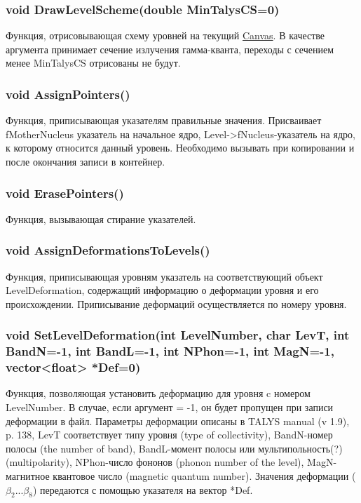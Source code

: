 \documentclass[a4paper,12pt]{extarticle}
\begin{document}
\subsubsection{void DrawLevelScheme(double MinTalysCS=0)}
Функция, отрисовывающая схему уровней на текущий \href{https://root.cern.ch/doc/master/classTCanvas.html}{Canvas}. В качестве аргумента принимает сечение излучения гамма-кванта, переходы с сечением менее MinTalysCS отрисованы не будут.
\subsubsection{void AssignPointers()}
Функция, приписывающая указателям правильные значения. Присваивает fMotherNucleus указатель на начальное ядро, Level->fNucleus-указатель на ядро, к которому относится данный уровень. Необходимо вызывать при копировании и после окончания записи в контейнер.
\subsubsection{void ErasePointers()}
Функция, вызывающая стирание указателей.
\subsubsection{void AssignDeformationsToLevels()}
Функция, приписывающая уровням указатель на соответствующий объект LevelDeformation, содержащий информацию о деформации уровня и его происхождении. Приписывание деформаций осуществляется по номеру уровня.
\subsubsection{void SetLevelDeformation(int LevelNumber, char LevT, int BandN=-1, int BandL=-1, int NPhon=-1, int MagN=-1, vector<float> *Def=0)}
Функция, позволяющая установить деформацию для уровня c номером LevelNumber. В случае, если аргумент = -1, он будет пропущен при записи деформации в файл. Параметры деформации описаны в TALYS manual (v 1.9), p. 138, LevT соответствует типу уровня (type of collectivity), BandN-номер полосы (the number of band), BandL-момент полосы или мультипольность(?) (multipolarity), NPhon-число фононов (phonon number of the level), MagN-магнитное квантовое число (magnetic quantum number). Значения деформации ($\beta_2...\beta_8$) передаются с помощью указателя на вектор *Def.
\end{document}
